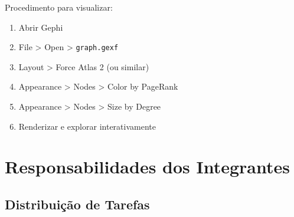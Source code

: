 \documentclass[12pt,a4paper]{article}
\begin{document}
Procedimento para visualizar:
\begin{enumerate}
  \item Abrir Gephi
  \item File > Open > \texttt{graph.gexf}
  \item Layout > Force Atlas 2 (ou similar)
  \item Appearance > Nodes > Color by PageRank
  \item Appearance > Nodes > Size by Degree
  \item Renderizar e explorar interativamente
\end{enumerate}

\section{Responsabilidades dos Integrantes}\label{sec:responsabilidades}

\subsection{Distribuição de Tarefas}
\end{document}
